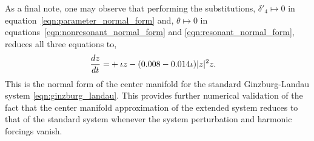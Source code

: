 As a final note, one may observe that performing the substitutions, $\delta'_{4} \mapsto 0$ in equation~\eqref{eqn:parameter_normal_form} and, $\theta \mapsto 0$ in equations~\eqref{eqn:nonresonant_normal_form} and \eqref{eqn:resonant_normal_form}, reduces all three equations to,
\begin{align}
	\label{eqn:standard_normal_form}
	\begin{aligned}
		\dfrac{d z}{d t} =&
		+\iota z - (0.008-0.014\iota)|z|^{2}z.
	\end{aligned}
\end{align}
This is the normal form of the center manifold for the standard Ginzburg-Landau system \eqref{eqn:ginzburg_landau}. This provides further numerical validation of the fact that the center manifold approximation of the extended system reduces to that of the standard system whenever the system perturbation and harmonic forcings vanish.





